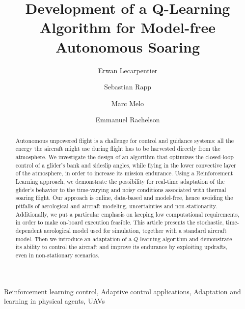 \documentclass{ifacconf}
\begin{document}
\begin{frontmatter}
\title{Development of a Q-Learning Algorithm for Model-free Autonomous Soaring}


\author{Erwan Lecarpentier} 
\author{Sebastian Rapp} 
\author{Marc Melo}
\author{Emmanuel Rachelson}

\address{ISAE -- SUPAERO, Dept of Complex Systems Engineering, 10 avenue E. Belin, 31055 Toulouse, France.}


\begin{abstract}
Autonomous unpowered flight is a challenge for control and guidance systems: all the energy the aircraft might use during flight has to be harvested directly from the atmosphere.
We investigate the design of an algorithm that optimizes the closed-loop control of a glider's bank and sideslip angles, while flying in the lower convective layer of the atmosphere, in order to increase its mission endurance.
Using a Reinforcement Learning approach, we demonstrate the possibility for real-time adaptation of the glider's behavior to the time-varying and noisy conditions associated with thermal soaring flight.
Our approach is online, data-based and model-free, hence avoiding the pitfalls of aerological and aircraft modeling, uncertainties and non-stationarity.
Additionally, we put a particular emphasis on keeping low computational requirements, in order to make on-board execution feasible.
This article presents the stochastic, time-dependent aerological model used for simulation, together with a standard aircraft model. Then we introduce an adaptation of a $Q$-learning algorithm and demonstrate its ability to control the aircraft and improve its endurance by exploiting updrafts, even in non-stationary scenarios.
\end{abstract}

\begin{keyword}
Reinforcement learning control, Adaptive control applications, Adaptation and learning in physical agents, UAVs
\end{keyword}

\end{frontmatter}
\end{document}
